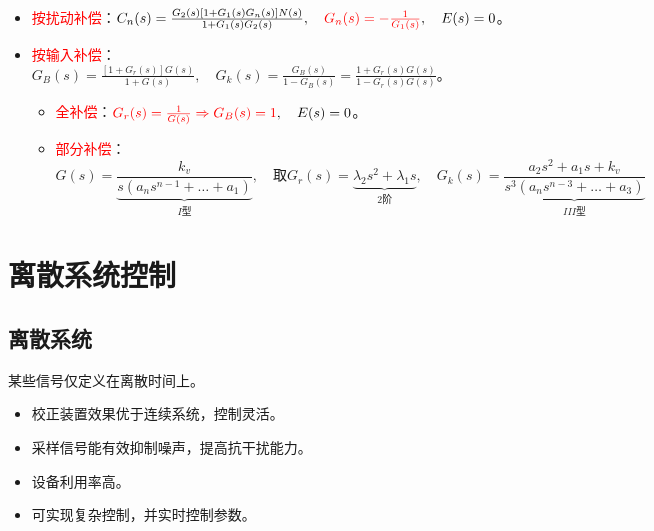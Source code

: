 \documentclass[
12pt, %
a4paper, 
oneside, %
]{scrartcl}
\begin{document}
\begin{itemize}
\item \textcolor{red}{按扰动补偿}：$ C_n(s) = \frac{G_2(s)[1 + G_1(s)G_n(s)]N(s)}{1 + G_1(s)G_2(s)}, \quad \textcolor{red}{G_n(s) = -\frac{1}{G_1(s)}}, \quad E(s) = 0 $。
\item \textcolor{red}{按输入补偿}：$ G_B(s) = \frac{[1 + G_r(s)]G(s)}{1 + G(s)}, \quad G_k(s) = \frac{G_B(s)}{1 - G_B(s)} = \frac{1 + G_r(s)G(s)}{1 - G_r(s)G(s)} $。
\begin{itemize}
\item \textcolor{red}{全补偿}：$ \textcolor{red}{G_r(s) = \frac{1}{G(s)} \Rightarrow G_B(s) = 1}, \quad E(s) = 0 $。
\item \textcolor{red}{部分补偿}：
$$ G(s) = \underbrace{\frac{k_v}{s(a_n s^{n - 1} + \dots + a_1)}}_{I\text{型}}, \quad \text{取} G_r(s) = \underbrace{\lambda_2 s^2 + \lambda_1 s}_{2\text{阶}}, \quad G_k(s) = \underbrace{\frac{a_2 s^2 + a_1 s + k_v}{s^3(a_n s^{n - 3} + \dots + a_3)}}_{III\text{型}} $$
\end{itemize}
\end{itemize}
\section{离散系统控制}
\subsection[离散系统]{离散系统}
某些信号仅定义在离散时间上。
\begin{itemize}
\item 校正装置效果优于连续系统，控制灵活。
\item 采样信号能有效抑制噪声，提高抗干扰能力。
\item 设备利用率高。
\item 可实现复杂控制，并实时控制参数。
\end{itemize}
\end{document}
